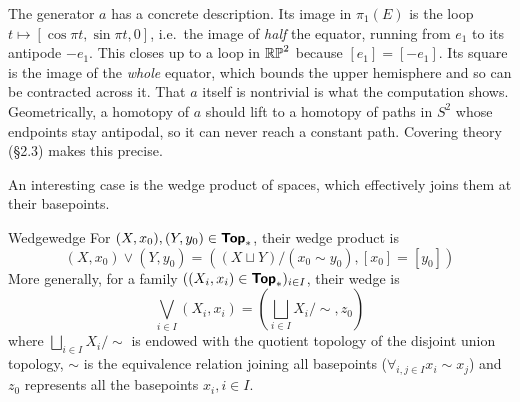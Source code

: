 \begin{figureBox}
\end{figureBox}
\label{fig:pi1rp2}

The generator $a$ has a concrete description. Its image in $\pi_1(E)$ is the loop $t\mapsto[\cos\pi t,\sin\pi t,0]$, i.e.\ the image of \emph{half} the equator, running from $e_1$ to its antipode $-e_1$. This closes up to a loop in $\mathbb{RP}^{2}$ because $[e_1]=[-e_1]$. Its square is the image of the \emph{whole} equator, which bounds the upper hemisphere and so can be contracted across it. That $a$ itself is nontrivial is what the computation shows. Geometrically, a homotopy of $a$ should lift to a homotopy of paths in $S^2$ whose endpoints stay antipodal, so it can never reach a constant path. Covering theory (§2.3) makes this precise.

\newpage

An interesting case is the wedge product of spaces, which effectively joins them at their basepoints.

\begin{definition}{Wedge}{wedge}
  For $(X,x_0),(Y,y_0)\in\bm{\mathsf{Top}}_*$, their wedge product is \[
    (X,x_0)\lor (Y,y_0) = ((X\sqcup Y) / (x_0\sim y_0),[x_0]=[y_0])
  \]
  More generally, for a family $((X_i,x_i)\in\bm{\mathsf{Top}}_*)_{i\in I}$, their wedge is \[
    \bigvee_{i\in I}(X_i,x_i) = \left(\bigsqcup_{i\in I}X_i/\sim,z_0\right)
  \]
  where $\bigsqcup_{i\in I}X_i/\sim$ is endowed with the quotient topology of the disjoint union topology, $\sim$ is the equivalence relation joining all basepoints ($\forall_{i,j\in I}x_i\sim x_j$) and $z_0$ represents all the basepoints $x_i,i\in I$.
\end{definition}

